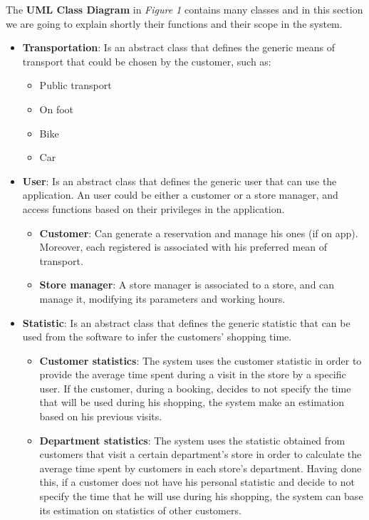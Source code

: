 \documentclass{article}
\begin{document}
			The {\bfseries UML Class Diagram} in \emph{Figure 1} contains many classes and in this section we are going to explain shortly their functions and their scope in the system.
			
			\begin{itemize}
				\item {\bfseries Transportation}: Is an abstract class that defines the generic means of transport that could be chosen by the customer, such as:
				
					\begin{itemize}
						\item Public transport
						\item On foot
						\item Bike
						\item Car
					\end{itemize}
				\newpage
				\item {\bfseries User}: Is an abstract class that defines the generic user that can use the application. An user could be either a customer or a store manager, and access functions based on their privileges in the application.
				
					\begin{itemize}
						\item {\bfseries Customer}: Can generate a reservation and manage his ones (if on app). Moreover, each registered is associated with his preferred mean of transport.						
						\item {\bfseries Store manager}: A store manager is associated to a store, and can manage it, modifying its parameters and working hours.
					\end{itemize}
				
				\item {\bfseries Statistic}: Is an abstract class that defines the generic statistic that can be used from the software to infer the customers' shopping time.			
				\begin{itemize}
					\item {\bfseries Customer statistics}: The system uses the customer statistic in order to provide the average time spent during a visit in the store by a specific user. If the customer, during a booking, decides to not specify the time that will be used during his shopping, the system make an estimation based on his previous visits.
					
					\item {\bfseries Department statistics}: The system uses the statistic obtained from customers that visit a certain department's store in order to calculate the average time spent by customers in each store's department. Having done this, if a customer does not have his personal statistic and decide to not specify the time that he will use during his shopping, the system can base its estimation on statistics of other customers. 
				

\end{itemize}
\end{itemize}
\end{document}
